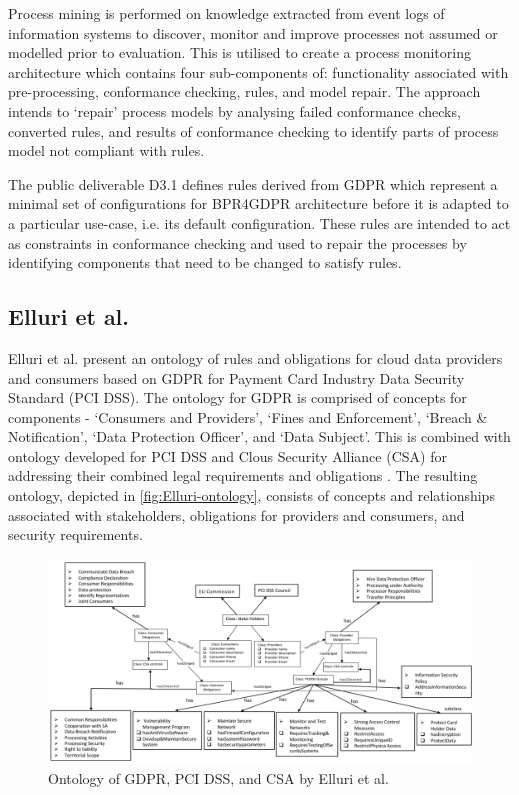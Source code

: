 Process mining is performed on knowledge extracted from event logs of
information systems to discover, monitor and improve processes not
assumed or modelled prior to evaluation. This is utilised to create a
process monitoring architecture which contains four sub-components of:
functionality 
associated with pre-processing, conformance checking, rules, and model repair.
The approach intends to `repair' process models by analysing failed conformance checks, converted rules, and results of conformance checking to identify parts of process model not compliant with rules. 

The public deliverable D3.1 \cite{lioudakis_d3.1_2019} defines rules
derived from GDPR which represent a minimal set of configurations for BPR4GDPR architecture before it is adapted to a particular use-case, i.e. its default configuration. These rules are intended to act as constraints in conformance checking and used to repair the processes by identifying components that need to be changed to satisfy rules.

\subsection*{Elluri et al.}\label{sec:sota:Elluri}
Elluri et al. \cite{elluri_knowledge_2018, elluri_integrated_2018}
present an ontology of rules and obligations for cloud data providers
and consumers based on GDPR for Payment Card Industry Data Security
Standard (PCI DSS). The ontology for GDPR \cite{elluri_knowledge_2018} is comprised of concepts for components - `Consumers and Providers', `Fines and Enforcement', `Breach \& Notification', `Data Protection Officer', and `Data Subject'. This is combined with ontology developed for PCI DSS and Clous Security Alliance (CSA) for addressing their combined legal requirements and obligations \cite{elluri_integrated_2018}. The resulting ontology, depicted in \autoref{fig:Elluri-ontology}, consists of concepts and relationships associated with stakeholders, obligations for providers and consumers, and security requirements. 
\begin{figure}[htbp]
    \centering
    \includegraphics[width=\linewidth]{img/Elluri_ontology.png}
    \caption{Ontology of GDPR, PCI DSS, and CSA by Elluri et al. \cite{elluri_integrated_2018}}
    \label{fig:Elluri-ontology}
\end{figure}

